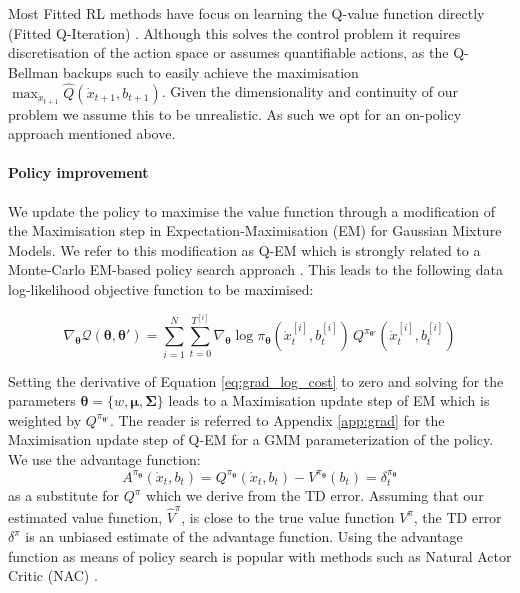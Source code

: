 \documentclass[final,3p,times,twocolumn]{elsarticle}
\newcommand{\B}{b}
\newcommand{\U}{\dot{x}}
\newcommand{\Param}{\boldsymbol{\theta}}
\begin{document}
Most Fitted RL methods have focus on learning the Q-value function directly (Fitted Q-Iteration) 
\cite{NIPS2008_3501,EGW05,Riedmiller2005}. Although this solves the control problem it requires discretisation 
of the action space or assumes quantifiable actions, as the Q-Bellman backups such to easily 
achieve the maximisation ${\max_{\U_{t+1}} \hat{Q}(\U_{t+1},\B_{t+1})}$. 
Given the dimensionality and continuity of our problem we assume this to be unrealistic. 
As such we opt for an on-policy approach mentioned above.


\paragraph{Policy improvement}

We update the policy to maximise the value function through a modification of the Maximisation 
step in Expectation-Maximisation (EM) for Gaussian Mixture Models. We refer to this modification as 
Q-EM which is strongly related to a Monte-Carlo EM-based policy search approach \cite[p.50]{p_search_surv_2011}.
This leads to the following data log-likelihood objective function to be maximised:

\begin{equation} \label{eq:grad_log_cost}
  \nabla_{\Param}\mathcal{Q}(\Param,\Param') = \sum\limits_{i=1}^{N} \sum\limits_{t=0}^{T^{[i]}} \nabla_{\Param}\log \pi_{\Param}(\U^{[i]}_t,\B^{[i]}_t) \, Q^{\pi_{\Param'}}(\U^{[i]}_t,\B^{[i]}_t)
\end{equation}

Setting the derivative of Equation \ref{eq:grad_log_cost} to zero and solving for the parameters
$\Param=\{w,\boldsymbol{\mu},\boldsymbol{\Sigma}\}$ leads to a Maximisation update step of EM which is weighted by $Q^{\pi_{\Param'}}$.
The reader is referred to Appendix \ref{app:grad} for the Maximisation update step of Q-EM for a GMM parameterization of the policy. 
We use the advantage function:
\begin{equation}\label{eq:advantage_f}
 A^{\pi_{\Param}}(\U_t,\B_t) =  Q^{\pi_{\Param}}(\U_t,\B_t) - V^{\pi_{\Param}}(\B_t) = \delta^{\pi_{\Param}}_t
\end{equation}
as a substitute for $Q^{\pi}$ which we derive from the TD error. Assuming that our estimated 
value function, $\hat{V}^{\pi}$, is close to the true value function $V^{\pi}$, the 
TD error $\delta^{\pi}$ is an unbiased estimate of the advantage function. Using the 
advantage function as means of policy search is popular with methods such as Natural Actor Critic (NAC) \cite{peter_nac_2008}.
\end{document}
